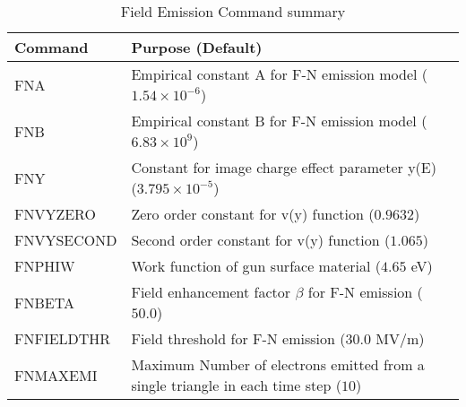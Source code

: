 \begin{table}[ht] \footnotesize
  \begin{center}
    \caption{Field Emission Command summary}
    \label{tab:fieldfmissioncmd}
    \begin{tabular}{|l|p{}|l|}
      \hline
      Command &Purpose (Default) \\
      \hline
      FNA&Empirical constant A for F-N emission model ($1.54\times10^{-6}$)\\
      FNB&Empirical constant B for F-N emission model ($6.83\times10^9$) \\
      FNY&Constant for image charge effect parameter y(E) ($3.795\times10^{-5}$) \\
      FNVYZERO&Zero order constant for v(y) function ($0.9632$) \\
      FNVYSECOND&Second order constant for v(y) function ($1.065$)\\
      FNPHIW&Work function of gun surface material ($4.65$ eV) \\
      FNBETA&Field enhancement factor $\beta$ for F-N emission ($50.0$) \\
      FNFIELDTHR&Field threshold for F-N emission ($30.0$ MV/m) \\
      FNMAXEMI&Maximum Number of electrons emitted from a single triangle in each time step ($10$) \\

      \hline
    \end{tabular}
  \end{center}
\end{table}



